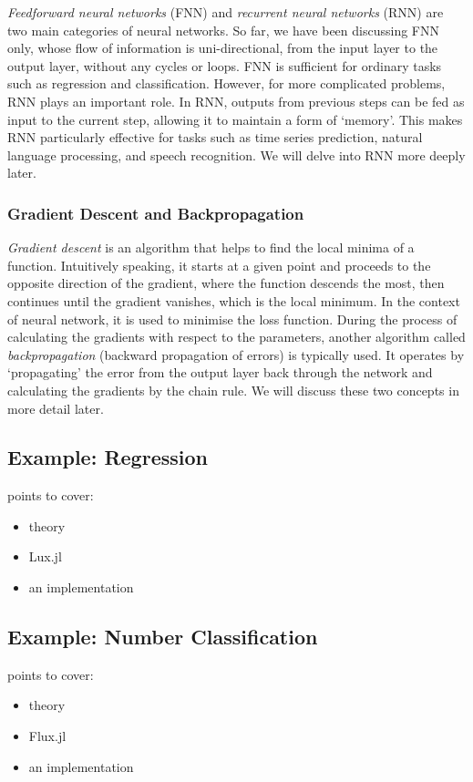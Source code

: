 \documentclass[a4paper,11pt, titlepage]{article}
\theoremstyle{definition}
\theoremstyle{plain}
\theoremstyle{remark}
\begin{document}
\textit{Feedforward neural networks} (FNN) and \textit{recurrent neural networks} (RNN) are two main categories of neural networks. So far, we have been discussing FNN only, whose flow of information is uni-directional, from the input layer to the output layer, without any cycles or loops. FNN is sufficient for ordinary tasks such as regression and classification. However, for more complicated problems, RNN plays an important role. In RNN, outputs from previous steps can be fed as input to the current step, allowing it to maintain a form of ‘memory’. This makes RNN particularly effective for tasks such as time series prediction, natural language processing, and speech recognition. We will delve into RNN more deeply later.

\subsubsection{Gradient Descent and Backpropagation}

\textit{Gradient descent} is an algorithm that helps to find the local minima of a function. Intuitively speaking, it starts at a given point and proceeds to the opposite direction of the gradient, where the function descends the most, then continues until the gradient vanishes, which is the local minimum. In the context of neural network, it is used to minimise the loss function. During the process of calculating the gradients with respect to the parameters, another algorithm called \textit{backpropagation} (backward propagation of errors) is typically used. It operates by ‘propagating’ the error from the output layer back through the network and calculating the gradients by the chain rule. We will discuss these two concepts in more detail later.

\subsection{Example: Regression}
points to cover:
\begin{itemize}
    \item theory
    \item Lux.jl
    \item an implementation
\end{itemize}

\subsection{Example: Number Classification}
points to cover:
\begin{itemize}
    \item theory
    \item Flux.jl
    \item an implementation
\end{itemize}
\end{document}
